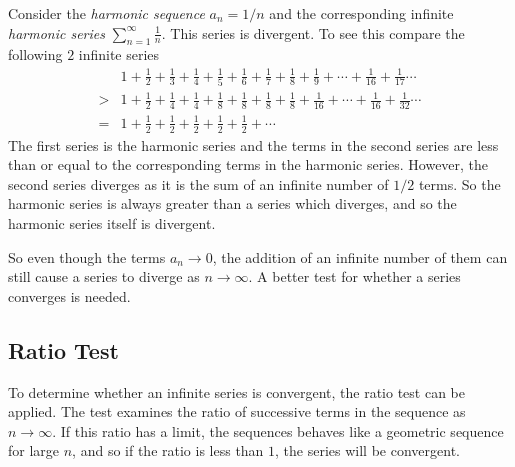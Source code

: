 \documentclass[]{report}
\begin{document}
Consider the \emph{harmonic sequence} $a_n=1/n$ and the corresponding infinite \emph{harmonic series} $\displaystyle \sum_{n=1}^{\infty} \frac{1}{n}$. This series is divergent. To see this compare the following $2$ infinite series
\begin{align*}
  &1+\frac{1}{2}+\frac{1}{3}+\frac{1}{4}+\frac{1}{5}+\frac{1}{6}+\frac{1}{7}+\frac{1}{8}+\frac{1}{9}+\cdots+\frac{1}{16}+\frac{1}{17}\cdots\\
  >&1+\frac{1}{2}+\frac{1}{4}+\frac{1}{4}+\frac{1}{8}+\frac{1}{8}+\frac{1}{8}+\frac{1}{8}+\frac{1}{16}+\cdots+\frac{1}{16}+\frac{1}{32}\cdots\\
  = & 1+\frac{1}{2}+\frac{1}{2}+\frac{1}{2}+\frac{1}{2}+\frac{1}{2}+\cdots
\end{align*}
The first series is the harmonic series and the terms in the second series are less than or equal to the corresponding terms in the harmonic series. However, the second series diverges as it is the sum of an infinite number of $1/2$ terms. So the harmonic series is always greater than a series which diverges, and so the harmonic series itself is divergent.

So even though the terms $a_n \to 0$, the addition of an infinite number of them can still cause a series to diverge as $n \to \infty $. A better test for whether a series converges is needed.

\subsection*{Ratio Test}
To determine whether an infinite series is convergent, the ratio test can be applied. The test examines the ratio of successive terms in the sequence as $n \to \infty$. If this ratio has a limit, the sequences behaves like a geometric sequence for large $n$, and so if the ratio is less than $1$, the series will be convergent.
\end{document}

